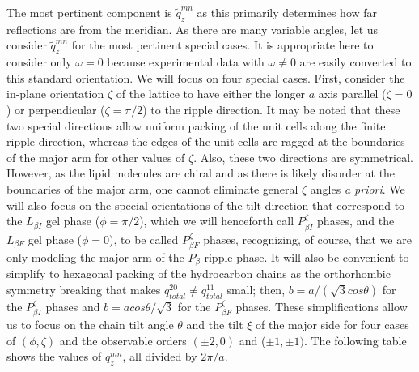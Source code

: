 The most pertinent component is $\tilde{q}_z^{mn}$ as this primarily determines 
how far reflections are from the meridian.  As there are many variable angles, 
let us consider $\tilde{q}_z^{mn}$ for the most pertinent special cases.  It is 
appropriate here to consider only $\omega=0$ because experimental data with 
$\omega{\neq}0$ are easily converted to this standard orientation.  We will 
focus on four special cases.  First, consider the in-plane orientation ${\zeta}$ 
of the lattice to have either the longer $a$ axis parallel (${\zeta}=0$) or 
perpendicular (${\zeta}={\pi}/2$) to the ripple direction.  It may be noted 
that these two special directions allow uniform packing of the unit cells along 
the finite ripple direction, whereas the edges of the unit cells are ragged at 
the boundaries of the major arm for other values of ${\zeta}$.  Also, these two 
directions are symmetrical.  However, as the lipid molecules are chiral and as 
there is likely disorder at the boundaries of the major arm, one cannot 
eliminate general ${\zeta}$ angles {\it a priori}.  We will also focus on the 
special orientations of the tilt direction that correspond to the $L_{{\beta}I}$ 
gel phase ($\phi=\pi/2$), which we will henceforth call $P_{{\beta}I}^{\zeta}$ 
phases, and the $L_{{\beta}F}$ gel phase ($\phi=0$), to be called 
$P_{{\beta}F}^{\zeta}$ phases, recognizing, of course, that we are only modeling 
the major arm of the $P_{\beta}$ ripple phase.   It will also be convenient to 
simplify to hexagonal packing of the hydrocarbon chains as the orthorhombic 
symmetry breaking that makes $q_{total}^{20}{\neq}q_{total}^{11}$ small; 
then, $b=a/(\sqrt{3}cos{\theta})$ for the $P_{{\beta}I}^{\zeta}$ phases and 
$b=acos{\theta}/\sqrt{3}$ for the $P_{{\beta}F}^{\zeta}$ phases.  These 
simplifications allow us to focus on the chain tilt angle $\theta$ and the 
tilt $\xi$ of the major side for four cases of $(\phi,\zeta)$ and the 
observable orders $({\pm}2,0)$ and (${\pm}1,{\pm}1)$.  The following table 
shows the values of $q_z^{mn}$, all divided by $2\pi/a$.  


